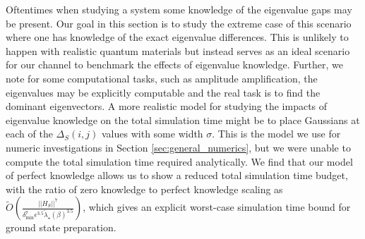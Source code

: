 \documentclass[
 amsmath,amssymb,
 aps,
onecolumn, 
nofootinbib]{revtex4-2}
\newcommand{\norm}[1]{\left|\left| #1 \right|\right|}
\newcommand{\bigotilde}[1]{\widetilde{O} \left( #1 \right)}
\begin{document}
Oftentimes when studying a system some knowledge of the eigenvalue gaps may be present. Our goal in this section is to study the extreme case of this scenario where one has knowledge of the exact eigenvalue differences. This is unlikely to happen with realistic quantum materials but instead serves as an ideal scenario for our channel to benchmark the effects of eigenvalue knowledge. Further, we note for some computational tasks, such as amplitude amplification, the eigenvalues may be explicitly computable and the real task is to find the dominant eigenvectors. A more realistic model for studying the impacts of eigenvalue knowledge on the total simulation time might be to place Gaussians at each of the $\Delta_S(i,j)$ values with some width $\sigma$. This is the model we use for numeric investigations in Section \ref{sec:general_numerics}, but we were unable to compute the total simulation time required analytically. We find that our model of perfect knowledge allows us to show a reduced total simulation time budget, with the ratio of zero knowledge to perfect knowledge scaling as $\bigotilde{\frac{\norm{H_S}^7}{\delta_{\min}^7 \epsilon^{3.5} \widetilde{\lambda}_\star(\beta)^{3.5}}}$, 
     which gives an explicit worst-case simulation time bound for ground state preparation.
\end{document}
